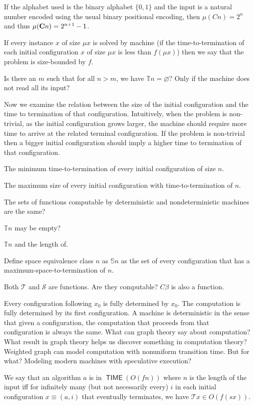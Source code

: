 \documentclass[10pt,statementpaper]{memoir}
\theoremstyle{definition}
\newcommand\TC{\mathcal{T}}
\newcommand\Teq{\mathbb{T}}
\newcommand\Seq{\mathbb{S}}
\newcommand\SC{\mathcal{S}}
\newcommand\TIME{\operatorname{\mathsf{TIME}}}
\begin{document}
If the alphabet used is the binary alphabet $\{ 0, 1 \}$
and the input is a natural number encoded using the usual binary positional encoding,
then $\mu (C n) = 2^n$ and thus $\mu (\mathbf{C} n) = 2^{n + 1} - 1$.

If every instance $x$ of size $\mu x$ is solved by machine
(if the time-to-termination of each initial configuration $x$ of size $\mu x$ is less than $f(\mu x)$)
then we say that the problem is size-bounded by $f$.

Is there an $m$ such that for all $n > m$, we have $\Teq n = \varnothing$?
Only if the machine does not read all its input?

Now we examine the relation between the size of the initial configuration
and the time to termination of that configuration.
Intuitively, when the problem is non-trivial, as the initial configuration grows larger,
the machine should require more time to arrive at the related terminal configuration.
If the problem is non-trivial then a bigger initial configuration
should imply a higher time to termination of that configuration.

The minimum time-to-termination of every initial configuration of size $n$.

The maximum size of every initial configuration with time-to-termination of $n$.

The sets of functions computable by deterministic and nondeterministic machines are the same?

$\Teq n$ may be empty?

$\Teq n$ and the length of.

Define space equivalence class $n$ as $\Seq n$ as the set of
every configuration that has a maximum-space-to-termination of $n$.

Both $\TC$ and $\SC$ are functions.
Are they computable?
$C \beta$ is also a function.

Every configuration following $x_0$ is fully determined by $x_0$.
The computation is fully determined by its first configuration.
A machine is deterministic in the sense that given a configuration,
the computation that proceeds from that configuration is always the same.
What can graph theory say about computation?
What result in graph theory helps us discover something in computation theory?
Weighted graph can model computation with nonuniform transition time.
But for what?
Modeling modern machines with speculative execution?

We say that an algorithm $a$ is in $\TIME(O(f n))$ where $n$ is the length of the input iff
for infinitely many (but not necessarily every) $i$ in each initial configuration
$x \equiv (a,i)$ that eventually terminates, we have $\TC x \in O(f(s x))$.
\end{document}
